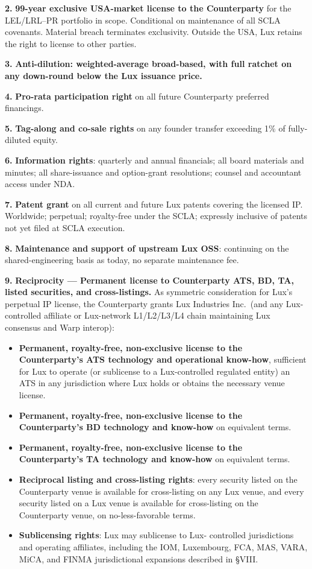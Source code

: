 \documentclass[11pt,letterpaper]{article}
\begin{document}
\textbf{2.} \textbf{99-year exclusive USA-market license to the
Counterparty} for the LEL/LRL--PR portfolio in scope. Conditional on
maintenance of all SCLA covenants. Material breach terminates
exclusivity. Outside the USA, Lux retains the right to license to
other parties.

\textbf{3.} \textbf{Anti-dilution: weighted-average broad-based,
with full ratchet on any down-round below the Lux issuance price.}

\textbf{4.} \textbf{Pro-rata participation right} on all future
Counterparty preferred financings.

\textbf{5.} \textbf{Tag-along and co-sale rights} on any founder
transfer exceeding 1\% of fully-diluted equity.

\textbf{6.} \textbf{Information rights}: quarterly and annual
financials; all board materials and minutes; all share-issuance and
option-grant resolutions; counsel and accountant access under NDA.

\textbf{7.} \textbf{Patent grant} on all current and future Lux
patents covering the licensed IP. Worldwide; perpetual; royalty-free
under the SCLA; expressly inclusive of patents not yet filed at SCLA
execution.

\textbf{8.} \textbf{Maintenance and support of upstream Lux OSS}:
continuing on the shared-engineering basis as today, no separate
maintenance fee.

\textbf{9.} \textbf{Reciprocity --- Permanent license to Counterparty
ATS, BD, TA, listed securities, and cross-listings.} As symmetric
consideration for Lux's perpetual IP license, the Counterparty grants
Lux Industries Inc.\ (and any Lux-controlled affiliate or Lux-network
L1/L2/L3/L4 chain maintaining Lux consensus and Warp interop):

\begin{itemize}[leftmargin=2em,itemsep=0.1em]
\item \textbf{Permanent, royalty-free, non-exclusive license to the
Counterparty's ATS technology and operational know-how}, sufficient
for Lux to operate (or sublicense to a Lux-controlled regulated
entity) an ATS in any jurisdiction where Lux holds or obtains the
necessary venue license.
\item \textbf{Permanent, royalty-free, non-exclusive license to the
Counterparty's BD technology and know-how} on equivalent terms.
\item \textbf{Permanent, royalty-free, non-exclusive license to the
Counterparty's TA technology and know-how} on equivalent terms.
\item \textbf{Reciprocal listing and cross-listing rights}: every
security listed on the Counterparty venue is available for
cross-listing on any Lux venue, and every security listed on a Lux
venue is available for cross-listing on the Counterparty venue, on
no-less-favorable terms.
\item \textbf{Sublicensing rights}: Lux may sublicense to Lux-
controlled jurisdictions and operating affiliates, including the
IOM, Luxembourg, FCA, MAS, VARA, MiCA, and FINMA jurisdictional
expansions described in \S VIII.
\end{itemize}
\end{document}
